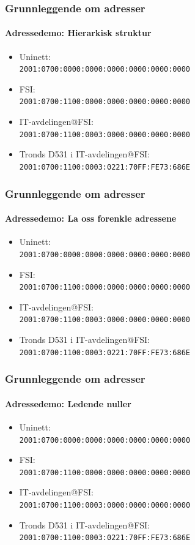 \begin{frame}
  \frametitle{Grunnleggende om adresser}
  \framesubtitle{Adressedemo: Hierarkisk struktur}
  \begin{itemize}
  \item Uninett:\\\texttt{\alert{2001:0700}:0000:0000:0000:0000:0000:0000\phantom{/32}}
  \item FSI:\\\texttt{2001:0700:\alert{1100}:0000:0000:0000:0000:0000\phantom{/48}}
  \item IT-avdelingen@FSI:\\\texttt{2001:0700:1100:\alert{0003}:0000:0000:0000:0000\phantom{/64}}
  \item Tronds D531 i IT-avdelingen@FSI:\\\texttt{2001:0700:1100:0003:\alert{0221:70FF:FE73:686E}\phantom{/128}}
  \end{itemize}
\end{frame}

\begin{frame}
  \frametitle{Grunnleggende om adresser}
  \framesubtitle{Adressedemo: La oss forenkle adressene}
  \begin{itemize}
  \item Uninett:\\\texttt{2001:0700:0000:0000:0000:0000:0000:0000\phantom{/32}}
  \item FSI:\\\texttt{2001:0700:1100:0000:0000:0000:0000:0000\phantom{/48}}
  \item IT-avdelingen@FSI:\\\texttt{2001:0700:1100:0003:0000:0000:0000:0000\phantom{/64}}
  \item Tronds D531 i IT-avdelingen@FSI:\\\texttt{2001:0700:1100:0003:0221:70FF:FE73:686E\phantom{/128}}
  \end{itemize}
\end{frame}

\begin{frame}
  \frametitle{Grunnleggende om adresser}
  \framesubtitle{Adressedemo: Ledende nuller}
  \begin{itemize}
  \item Uninett:\\\texttt{2001:\alert{0}700:\alert{000}0:\alert{000}0:\alert{000}0:\alert{000}0:\alert{000}0:\alert{000}0\phantom{/32}}
  \item FSI:\\\texttt{2001:\alert{0}700:1100:\alert{000}0:\alert{000}0:\alert{000}0:\alert{000}0:\alert{000}0\phantom{/48}}
  \item IT-avdelingen@FSI:\\\texttt{2001:\alert{0}700:1100:\alert{000}3:\alert{000}0:\alert{000}0:\alert{000}0:\alert{000}0\phantom{/64}}
  \item Tronds D531 i IT-avdelingen@FSI:\\\texttt{2001:\alert{0}700:1100:\alert{000}3:\alert{0}221:70FF:FE73:686E\phantom{/128}}
  \end{itemize}
\end{frame}

